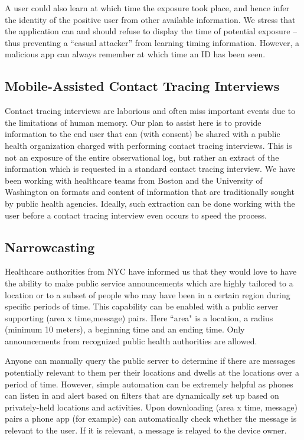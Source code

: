 \documentclass{article}
\begin{document}
A user could also learn at which time the exposure took place, and hence infer the identity of the positive user from other available information. We stress that the application can and should refuse to display the time of potential exposure -- thus preventing a ``casual attacker'' from learning timing information. However, a malicious app can always remember at which time an ID has been seen.


\subsection{Mobile-Assisted Contact Tracing Interviews} 
Contact tracing interviews are laborious and often miss important events due to the limitations of human memory.  Our plan to assist here is to provide information to the end user that can (with consent) be shared with a public health organization charged with performing contact tracing interviews.  This is not an exposure of the entire observational log, but rather an extract of the information which is requested in a standard contact tracing interview. We have been working with healthcare teams from Boston and the University of Washington on formats and content of information that are traditionally sought by public health agencies.  Ideally, such extraction can be done working with the user before a contact tracing interview even occurs to speed the process.

\subsection{Narrowcasting}

Healthcare authorities from NYC have informed us that they would love to have the ability to make public service announcements which are highly tailored to a location or to a subset of people who may have been in a certain region during specific periods of time.  This capability can be enabled with a public server supporting (area x time,message) pairs.  Here ``area" is a location, a radius (minimum 10 meters), a beginning time and an ending time.  Only announcements from recognized public health authorities are allowed.  

Anyone can manually query the public server to determine if there are messages potentially relevant to them per their locations and dwells at the locations over a period of time. However, simple automation can be extremely helpful as phones can listen in and alert based on filters that are dynamically set up based on privately-held locations and activities. Upon downloading (area x time, message) pairs a phone app (for example) can automatically check whether the message is relevant to the user.  If it is relevant, a message is relayed to the device owner.
\end{document}
